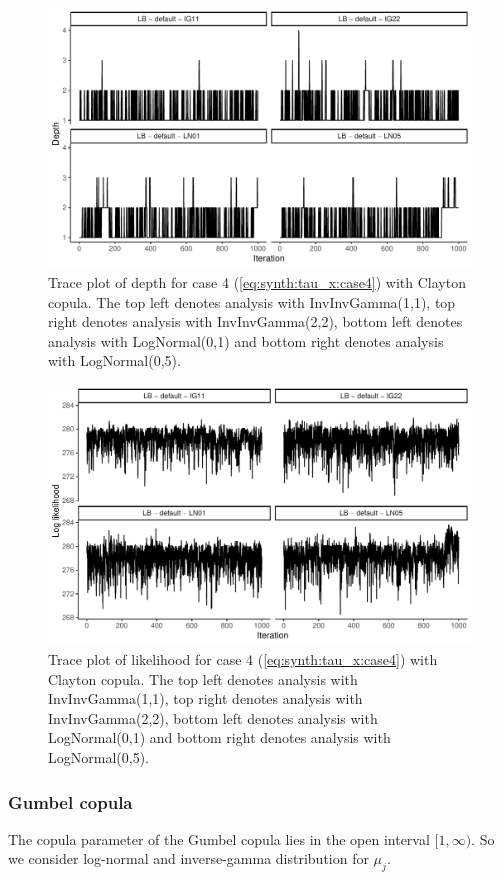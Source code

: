 \documentclass{amsart}
\begin{document}
\begin{figure}
	\centering
	\includegraphics[width = 0.75\linewidth]{trace_case4_clayton_depth.pdf}
	\caption{Trace plot of depth for case 4 (\cref{eq:synth:tau_x:case4}) with Clayton copula. The top left denotes analysis with InvInvGamma(1,1), top right denotes analysis with InvInvGamma(2,2), bottom left denotes analysis with LogNormal(0,1) and bottom right denotes analysis with LogNormal(0,5).}
	\label{fig:case4:clayton:depth}
\end{figure}

\begin{figure}
	\centering
	\includegraphics[width = 0.75\linewidth]{trace_case4_clayton_like.pdf}
	\caption{Trace plot of likelihood for case 4 (\cref{eq:synth:tau_x:case4}) with Clayton copula. The top left denotes analysis with InvInvGamma(1,1), top right denotes analysis with InvInvGamma(2,2), bottom left denotes analysis with LogNormal(0,1) and bottom right denotes analysis with LogNormal(0,5).}
	\label{fig:case4:clayton:like}
\end{figure}

\subsubsection{Gumbel copula} The copula parameter of the Gumbel copula lies in the open interval $[1,\infty)$. So we consider log-normal and inverse-gamma distribution for $\mu_j$.
\end{document}
